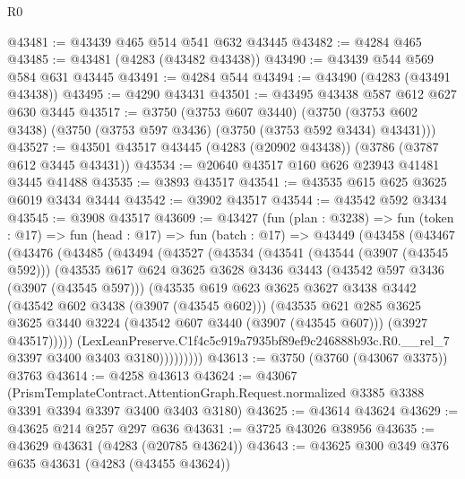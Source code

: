 \begin{lexlean}{R0}
\begin{coremodule}
@43481 := @43439 @465 @514 @541 @632 @43445
@43482 := @4284 @465
@43485 := @43481 (@4283 (@43482 @43438))
@43490 := @43439 @544 @569 @584 @631 @43445
@43491 := @4284 @544
@43494 := @43490 (@4283 (@43491 @43438))
@43495 := @4290 @43431
@43501 := @43495 @43438 @587 @612 @627 @630 @3445
@43517 := @3750
    (@3753 @607 @3440)
    (@3750 (@3753 @602 @3438) (@3750 (@3753 @597 @3436) (@3750 (@3753 @592 @3434) @43431)))
@43527 := @43501 @43517 @43445 (@4283 (@20902 @43438)) (@3786 (@3787 @612 @3445 @43431))
@43534 := @20640 @43517 @160 @626 @23943 @41481 @3445 @41488
@43535 := @3893 @43517
@43541 := @43535 @615 @625 @3625 @6019 @3434 @3444
@43542 := @3902 @43517
@43544 := @43542 @592 @3434
@43545 := @3908 @43517
@43609 := @43427
    (fun (plan : @3238) =>
    fun (token : @17) =>
    fun (head : @17) =>
    fun (batch : @17) =>
    @43449
      (@43458
        (@43467
          (@43476
            (@43485
              (@43494
                (@43527
                  (@43534
                    (@43541
                      (@43544 (@3907 (@43545 @592)))
                      (@43535
                        @617
                        @624
                        @3625
                        @3628
                        @3436
                        @3443
                        (@43542 @597 @3436 (@3907 (@43545 @597)))
                        (@43535
                          @619
                          @623
                          @3625
                          @3627
                          @3438
                          @3442
                          (@43542 @602 @3438 (@3907 (@43545 @602)))
                          (@43535
                            @621
                            @285
                            @3625
                            @3625
                            @3440
                            @3224
                            (@43542 @607 @3440 (@3907 (@43545 @607)))
                            (@3927 @43517)))))
                    (LexLeanPreserve.C1f4c5c919a7935bf89ef9c246888b93c.R0.__rel_7
                      @3397
                      @3400
                      @3403
                      @3180)))))))))
@43613 := @3750 (@3760 (@43067 @3375)) @3763
@43614 := @4258 @43613
@43624 := @43067
    (PrismTemplateContract.AttentionGraph.Request.normalized
      @3385
      @3388
      @3391
      @3394
      @3397
      @3400
      @3403
      @3180)
@43625 := @43614 @43624
@43629 := @43625 @214 @257 @297 @636
@43631 := @3725 @43026 @38956
@43635 := @43629 @43631 (@4283 (@20785 @43624))
@43643 := @43625 @300 @349 @376 @635 @43631 (@4283 (@43455 @43624))

\end{coremodule}
\end{lexlean}

